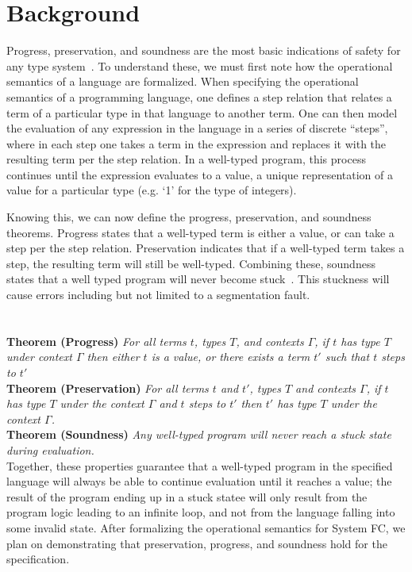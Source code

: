 \documentclass{sig-alternate}
\begin{document}
\section{Background}
\label{sec:background}
Progress, preservation, and soundness are the most basic indications of safety for any type system~\cite{Pierce:TAPL}. To understand these, we must first note how the operational semantics of a language are formalized. When specifying the operational semantics of a programming language, one defines a step relation that relates a term of a particular type in that language to another term. One can then model the evaluation of any expression in the language in a series of discrete ``steps'', where in each step one takes a term in the expression and replaces it with the resulting term per the step relation. In a well-typed program, this process continues until the expression evaluates to a value, a unique representation of a value for a particular type (e.g. `1' for the type of integers). 

Knowing this, we can now define the progress, preservation, and soundness theorems. Progress states that a well-typed term is either a value, or can take a step per the step relation. Preservation indicates that if a well-typed term takes a step, the resulting term will still be well-typed. Combining these, soundness states that a well typed program will never become stuck~\cite{Pierce:TAPL}. This stuckness will cause errors including but not limited to a segmentation fault. \\\\\\
\noindent\textbf{\large Theorem (Progress)} \textit{For all terms $t$, types $T$, and contexts $\Gamma$, if $t$ has type $T$ under context $\Gamma$ then either $t$ is a value, or there exists a term $t'$ such that $t$ steps to $t'$} \\

\noindent\textbf{\large Theorem (Preservation)} \textit{For all terms $t$ and $t'$, types $T$ and contexts $\Gamma$, if $t$ has type $T$ under the context $\Gamma$ and $t$ steps to $t'$ then $t'$ has type $T$ under the context $\Gamma$.} \\

\noindent\textbf{\large Theorem (Soundness)} \textit{Any well-typed program will never reach a stuck state during evaluation.}\\

Together, these properties guarantee that a well-typed program in the specified language will always be able to continue evaluation until it reaches a value; the result of the program ending up in a stuck statee will only result from the program logic leading to an infinite loop, and not from the language falling into some invalid state. After formalizing the operational semantics for System FC, we plan on demonstrating that preservation, progress, and soundness hold for the specification.
\end{document}
